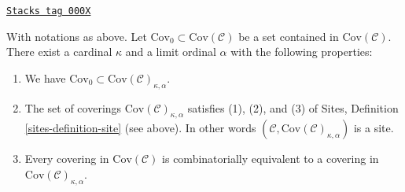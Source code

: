 \begin{lemma}
\label{sets-lemma-coverings-site}
\href{https://stacks.math.columbia.edu/tag/000X}{\texttt{Stacks tag 000X}}

With notations as above.
Let $\text{Cov}_0 \subset \text{Cov}(\mathcal{C})$
be a set contained in $\text{Cov}(\mathcal{C})$.
There exist a cardinal $\kappa$ and a limit ordinal $\alpha$
with the following properties:
\begin{enumerate}
\item We have $\text{Cov}_0 \subset \text{Cov}(\mathcal{C})_{\kappa, \alpha}$.
\item The set of coverings
$\text{Cov}(\mathcal{C})_{\kappa, \alpha}$ satisfies
(1), (2), and (3) of Sites, Definition \ref{sites-definition-site} (see above).
In other words $(\mathcal{C}, \text{Cov}(\mathcal{C})_{\kappa, \alpha})$
is a site.
\item Every covering in $\text{Cov}(\mathcal{C})$
is combinatorially equivalent
to a covering in $\text{Cov}(\mathcal{C})_{\kappa, \alpha}$.
\end{enumerate}
\end{lemma}

